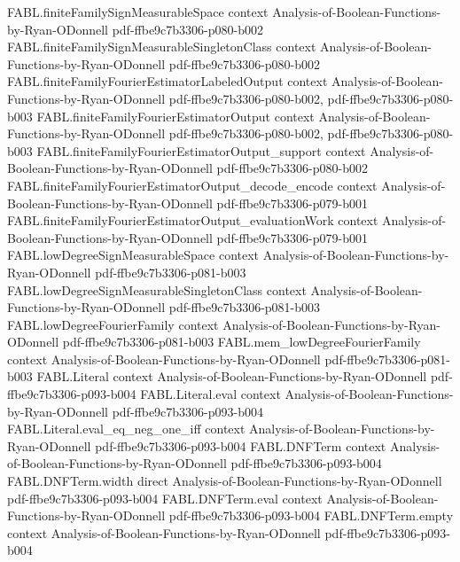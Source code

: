 \begin{theorem}
\proofstep
  {FABL.finiteFamilySignMeasurableSpace}
  {context}
  {Analysis-of-Boolean-Functions-by-Ryan-ODonnell}
  {pdf-ffbe9c7b3306-p080-b002}
\proofstep
  {FABL.finiteFamilySignMeasurableSingletonClass}
  {context}
  {Analysis-of-Boolean-Functions-by-Ryan-ODonnell}
  {pdf-ffbe9c7b3306-p080-b002}
\proofstep
  {FABL.finiteFamilyFourierEstimatorLabeledOutput}
  {context}
  {Analysis-of-Boolean-Functions-by-Ryan-ODonnell}
  {pdf-ffbe9c7b3306-p080-b002,
    pdf-ffbe9c7b3306-p080-b003}
\proofstep
  {FABL.finiteFamilyFourierEstimatorOutput}
  {context}
  {Analysis-of-Boolean-Functions-by-Ryan-ODonnell}
  {pdf-ffbe9c7b3306-p080-b002,
    pdf-ffbe9c7b3306-p080-b003}
\proofstep
  {FABL.finiteFamilyFourierEstimatorOutput_support}
  {context}
  {Analysis-of-Boolean-Functions-by-Ryan-ODonnell}
  {pdf-ffbe9c7b3306-p080-b002}
\proofstep
  {FABL.finiteFamilyFourierEstimatorOutput_decode_encode}
  {context}
  {Analysis-of-Boolean-Functions-by-Ryan-ODonnell}
  {pdf-ffbe9c7b3306-p079-b001}
\proofstep
  {FABL.finiteFamilyFourierEstimatorOutput_evaluationWork}
  {context}
  {Analysis-of-Boolean-Functions-by-Ryan-ODonnell}
  {pdf-ffbe9c7b3306-p079-b001}
\proofstep
  {FABL.lowDegreeSignMeasurableSpace}
  {context}
  {Analysis-of-Boolean-Functions-by-Ryan-ODonnell}
  {pdf-ffbe9c7b3306-p081-b003}
\proofstep
  {FABL.lowDegreeSignMeasurableSingletonClass}
  {context}
  {Analysis-of-Boolean-Functions-by-Ryan-ODonnell}
  {pdf-ffbe9c7b3306-p081-b003}
\proofstep
  {FABL.lowDegreeFourierFamily}
  {context}
  {Analysis-of-Boolean-Functions-by-Ryan-ODonnell}
  {pdf-ffbe9c7b3306-p081-b003}
\proofstep
  {FABL.mem_lowDegreeFourierFamily}
  {context}
  {Analysis-of-Boolean-Functions-by-Ryan-ODonnell}
  {pdf-ffbe9c7b3306-p081-b003}
\proofstep
  {FABL.Literal}
  {context}
  {Analysis-of-Boolean-Functions-by-Ryan-ODonnell}
  {pdf-ffbe9c7b3306-p093-b004}
\proofstep
  {FABL.Literal.eval}
  {context}
  {Analysis-of-Boolean-Functions-by-Ryan-ODonnell}
  {pdf-ffbe9c7b3306-p093-b004}
\proofstep
  {FABL.Literal.eval_eq_neg_one_iff}
  {context}
  {Analysis-of-Boolean-Functions-by-Ryan-ODonnell}
  {pdf-ffbe9c7b3306-p093-b004}
\proofstep
  {FABL.DNFTerm}
  {context}
  {Analysis-of-Boolean-Functions-by-Ryan-ODonnell}
  {pdf-ffbe9c7b3306-p093-b004}
\proofstep
  {FABL.DNFTerm.width}
  {direct}
  {Analysis-of-Boolean-Functions-by-Ryan-ODonnell}
  {pdf-ffbe9c7b3306-p093-b004}
\proofstep
  {FABL.DNFTerm.eval}
  {context}
  {Analysis-of-Boolean-Functions-by-Ryan-ODonnell}
  {pdf-ffbe9c7b3306-p093-b004}
\proofstep
  {FABL.DNFTerm.empty}
  {context}
  {Analysis-of-Boolean-Functions-by-Ryan-ODonnell}
  {pdf-ffbe9c7b3306-p093-b004}

\end{theorem}
